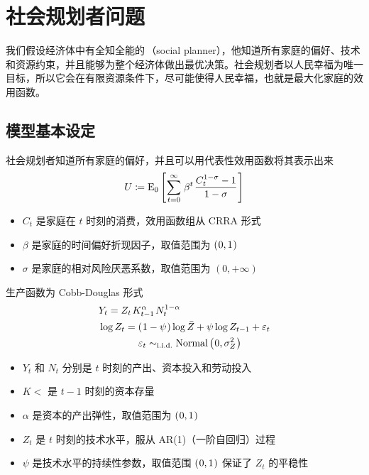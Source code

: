 \section{社会规划者问题}\label{sec:SocialPlanProb}

我们假设经济体中有全知全能的\,（social planner），他知道所有家庭的偏好、技术和资源约束，并且能够为整个经济体做出最优决策。社会规划者以人民幸福为唯一目标，所以它会在有限资源条件下，尽可能使得人民幸福，也就是最大化家庭的效用函数。

\subsection{模型基本设定}\label{subsec:BasicSetup}


社会规划者知道所有家庭的偏好，并且可以用代表性效用函数将其表示出来
\begin{align}
    U\coloneq \mean_0\bks{\sum\wsito \,\beta^t\,\dfrac{C_t^{1-\sigma}-1}{1-\sigma}}
\end{align}
\begin{itemize}
    \item \(C_t\) 是家庭在 \(t\) 时刻的消费，效用函数组从 CRRA 形式
    \item \(\beta\) 是家庭的时间偏好折现因子，取值范围为 \(\left(\mspace{1mu}0,1\mspace{1mu}\right)\)
    \item \(\sigma\) 是家庭的相对风险厌恶系数，取值范围为 \((0,+\infty)\)
\end{itemize}


生产函数为 Cobb-Douglas 形式
\begin{align}
    &Y_t=Z_t\,K\lt^\alpha\,N_t^{1-\alpha}\\
    &\log Z_t=\bka{1-\psi}\log\bar Z+\psi\log Z\lt+\varepsilon_t\\
    &\qquad\qquad \varepsilon_t\sim_\text{i.i.d.}\normal\bka{0,\sigma^2_Z}\notag
\end{align}
\begin{itemize}
    \item \(Y_t\) 和 \(N_t\) 分别是 \(t\) 时刻的产出、资本投入和劳动投入
    \item \(K\lt\) 是 \(t-1\) 时刻的资本存量
    \item \(\alpha\) 是资本的产出弹性，取值范围为 \(\left(\mspace{1mu}0,1\mspace{1mu}\right)\)
    \item \(Z_t\) 是 \(t\) 时刻的技术水平，服从 AR(1)（一阶自回归）过程
    \item \(\psi\) 是技术水平的持续性参数，取值范围 \(\left(\mspace{1mu}0,1\mspace{1mu}\right)\) 保证了 \(Z_t\) 的平稳性
\end{itemize}

